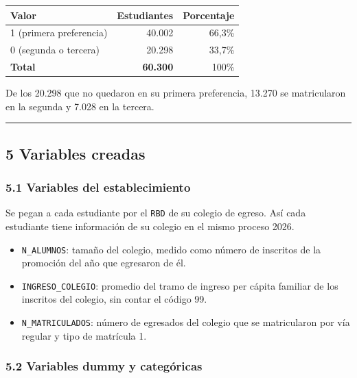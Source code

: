 \documentclass[11pt]{article}
\begin{document}
\begin{center}
\begin{tabular}{lrr}
\toprule
\textbf{Valor} & \textbf{Estudiantes} & \textbf{Porcentaje} \\
\midrule
1 (primera preferencia) & 40.002 & 66,3\% \\
0 (segunda o tercera)   & 20.298 & 33,7\% \\
\midrule
\textbf{Total} & \textbf{60.300} & 100\% \\
\bottomrule
\end{tabular}
\end{center}

De los 20.298 que no quedaron en su primera preferencia, 13.270 se
matricularon en la segunda y 7.028 en la tercera.

\medskip\hrule\medskip

\subsection*{5 \; Variables creadas}

\subsubsection*{5.1 \; Variables del establecimiento}

Se pegan a cada estudiante por el \texttt{RBD} de su colegio de egreso.
Así cada estudiante tiene información de su colegio en el mismo proceso
2026.

\begin{itemize}[leftmargin=1.5em, itemsep=0.3em]
  \item \texttt{N\_ALUMNOS}: tamaño del colegio, medido como número de
        inscritos de la promoción del año que egresaron de él.
  \item \texttt{INGRESO\_COLEGIO}: promedio del tramo de ingreso per
        cápita familiar de los inscritos del colegio, sin contar el
        código 99.
  \item \texttt{N\_MATRICULADOS}: número de egresados del colegio que se
        matricularon por vía regular y tipo de matrícula 1.
\end{itemize}

\subsubsection*{5.2 \; Variables dummy y categóricas}
\end{document}
